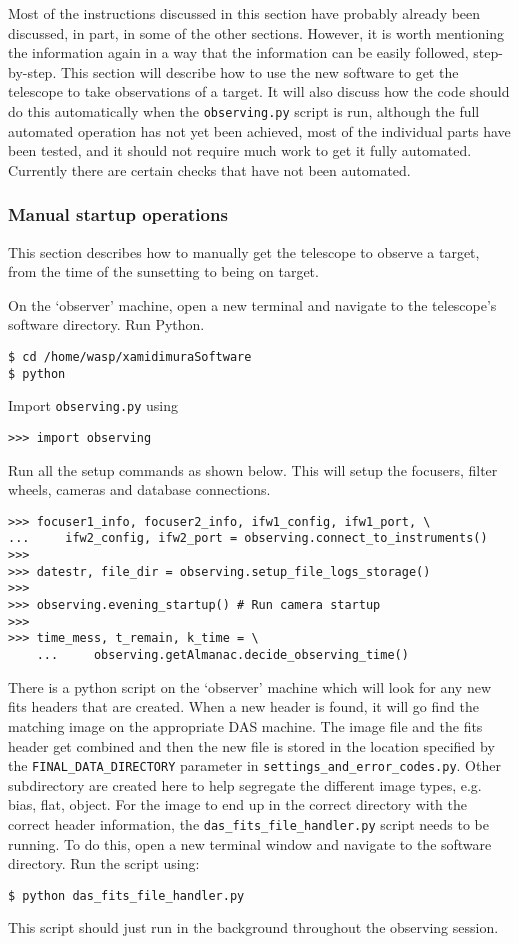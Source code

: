 \documentclass[a4paper,12pt]{article}
\newcommand{\observing}{\tt{observing.py}}
\begin{document}
Most of the instructions discussed in this section have probably already been discussed, in part, in some of the other sections. However, it is worth mentioning the information again in a way that the information can be easily followed, step-by-step. This section will describe how to use the new software to get the telescope to take observations of a target. It will also discuss how the code should do this automatically when the {\observing} script is run, although the full automated operation has not yet been achieved, most of the individual parts have been tested, and it should not require much work to get it fully automated. Currently there are certain checks that have not been automated.

\subsubsection{Manual startup operations}

This section describes how to manually get the telescope to observe a target, from the time of the sunsetting to being on target.

On the `observer' machine, open a new terminal and navigate to the telescope's software directory. Run Python.
\begin{verbatim}
$ cd /home/wasp/xamidimuraSoftware
$ python
\end{verbatim}
Import {\observing} using
\begin{verbatim}
>>> import observing
\end{verbatim}

Run all the setup commands as shown below. This will setup the focusers, filter wheels, cameras and database connections.

\begin{verbatim}
>>> focuser1_info, focuser2_info, ifw1_config, ifw1_port, \
...		ifw2_config, ifw2_port = observing.connect_to_instruments()
>>>
>>> datestr, file_dir = observing.setup_file_logs_storage()
>>>
>>> observing.evening_startup() # Run camera startup
>>>
>>> time_mess, t_remain, k_time = \
	...		observing.getAlmanac.decide_observing_time()
\end{verbatim}

There is a python script on the `observer' machine which will look for any new fits headers that are created. When a new header is found, it will go find the matching image on the appropriate DAS machine. The image file and the fits header get combined and then the new file is stored in the location specified by the {\tt FINAL\_DATA\_DIRECTORY} parameter in {\tt settings\_and\_error\_codes.py}. Other subdirectory are created here to help segregate the different image types, e.g. bias, flat, object. For the image to end up in the correct directory with the correct header information, the {\tt das\_fits\_file\_handler.py} script needs to be running. To do this, open a new terminal window and navigate to the software directory. Run the script using:
\begin{verbatim}
$ python das_fits_file_handler.py
\end{verbatim}
This script should just run in the background throughout the observing session.
\end{document}

